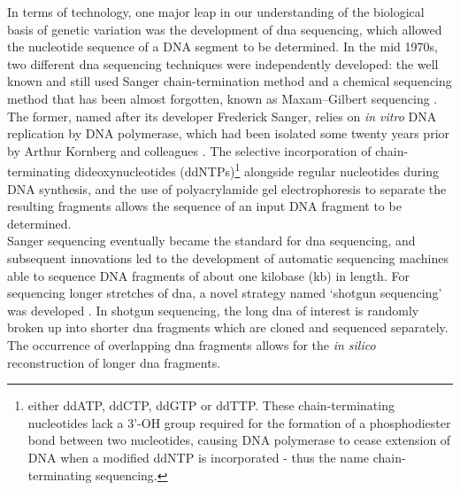 In terms of technology, one major leap in our understanding of the biological basis of genetic variation was the development of \gls{dna} sequencing, which allowed the nucleotide sequence of a DNA segment to be determined.
In the mid 1970s, two different \gls{dna} sequencing techniques were independently developed: the well known and still used Sanger chain-termination method \cite{sanger1975rapid, sanger1977dna} and a chemical sequencing method that has been almost forgotten, known as Maxam–Gilbert sequencing \cite{maxam1977new}.
The former, named after its developer Frederick Sanger,
relies on \textit{in vitro} DNA replication by DNA polymerase,
which had been isolated some twenty years prior by Arthur Kornberg and colleagues \cite{kornberg1956enzymic}.
The selective incorporation of chain-terminating dideoxynucleotides (ddNTPs)\footnote{either ddATP, ddCTP, ddGTP or ddTTP.
These chain-terminating nucleotides lack a 3'-OH group required for the formation of a phosphodiester bond between two nucleotides, causing DNA polymerase to cease extension of DNA when a modified ddNTP is incorporated - thus the name chain-terminating sequencing.} alongside regular nucleotides during DNA synthesis, and the use of polyacrylamide gel electrophoresis to separate the resulting fragments allows
the sequence of an input DNA fragment to be determined. \\

Sanger sequencing eventually became the standard for \gls{dna} sequencing, and
subsequent innovations led to the development of automatic sequencing machines able to sequence DNA fragments of about one kilobase (kb) in length. 
For sequencing longer stretches of \gls{dna}, a novel strategy named `shotgun sequencing' was developed \cite{staden1979strategy, anderson1981shotgun}. 
In shotgun sequencing, the long \gls{dna} of interest is randomly broken up into shorter \gls{dna} fragments which are cloned and sequenced separately. 
The occurrence of overlapping \gls{dna} fragments 
allows for the \textit{in silico} reconstruction of longer \gls{dna} fragments. \\

